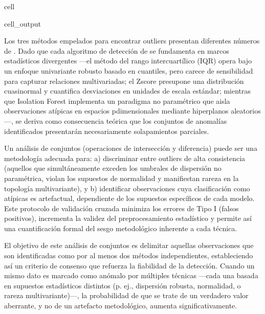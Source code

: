 \documentclass[a4paper,10pt,spanish]{jupyterBook}
\begin{document}
\begin{sphinxuseclass}{cell}
\begin{sphinxVerbatimOutput}
\begin{sphinxuseclass}{cell_output}
\noindent{}

\end{sphinxuseclass}\end{sphinxVerbatimOutput}

\end{sphinxuseclass}
\sphinxAtStartPar
Los tres métodos empelados para encontrar outliers presentan diferentes números de . Dado que cada algoritmo de detección de  se fundamenta en marcos estadísticos divergentes —el método del rango intercuartílico (IQR) opera bajo un enfoque univariante robusto basado en cuantiles, pero carece de sensibilidad para capturar relaciones multivariadas; el Z\sphinxhyphen{}score presupone una distribución cuasi\sphinxhyphen{}normal y cuantifica desviaciones en unidades de escala estándar; mientras que Isolation Forest implementa un paradigma no paramétrico que aisla observaciones atípicas en espacios p\sphinxhyphen{}dimensionales mediante hiperplanos aleatorios—, se deriva como consecuencia teórica que los conjuntos de anomalías identificados presentarán necesariamente solapamientos parciales.

\sphinxAtStartPar
Un análisis de conjuntos (operaciones de intersección y diferencia) puede ser una metodología adecuada para: a) discriminar entre outliers de alta consistencia (aquellos que simultáneamente exceden los umbrales de dispersión no paramétrica, violan los supuestos de normalidad y manifiestan rareza en la topología multivariante), y b) identificar observaciones cuya clasificación como atípicas es artefactual, dependiente de los supuestos específicos de cada modelo. Este protocolo de validación cruzada minimiza los errores de Tipo I (falsos positivos), incrementa la validez del preprocesamiento estadístico y permite así una cuantificación formal del sesgo metodológico inherente a cada técnica.

\sphinxAtStartPar
El objetivo de este análisis de conjuntos es delimitar aquellas observaciones que son identificadas como  por al menos dos métodos independientes, estableciendo así un criterio de consenso que refuerza la fiabilidad de la detección. Cuando un mismo dato es marcado como anómalo por múltiples técnicas —cada una basada en supuestos estadísticos distintos (p. ej., dispersión robusta, normalidad, o rareza multivariante)—, la probabilidad de que se trate de un verdadero valor aberrante, y no de un artefacto metodológico, aumenta significativamente.
\end{document}

